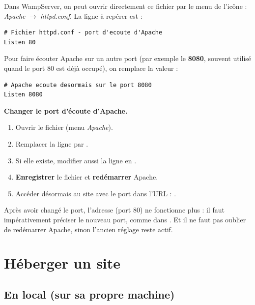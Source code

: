 Dans WampServer, on peut ouvrir directement ce fichier par le menu de l'icône :
\emph{Apache} $\rightarrow$ \emph{httpd.conf}. La ligne à repérer est :

\begin{verbatim}
# Fichier httpd.conf - port d'ecoute d'Apache
Listen 80
\end{verbatim}


Pour faire écouter Apache sur un autre port (par exemple le \textbf{8080}, souvent
utilisé quand le port 80 est déjà occupé), on remplace la valeur :

\begin{verbatim}
# Apache ecoute desormais sur le port 8080
Listen 8080
\end{verbatim}

\begin{methode}
\textbf{Changer le port d'écoute d'Apache.}
\begin{enumerate}[label=\arabic*)]
  \item Ouvrir le fichier  (menu \emph{Apache}).
  \item Remplacer la ligne  par .
  \item Si elle existe, modifier aussi la ligne  en
        .
  \item \textbf{Enregistrer} le fichier et \textbf{redémarrer} Apache.
  \item Accéder désormais au site avec le port dans l'URL :
        .
\end{enumerate}
\end{methode}

\begin{attention}
Après avoir changé le port, l'adresse  (port 80) ne fonctionne
plus : il faut impérativement préciser le nouveau port, comme dans
. Et il ne faut pas oublier de redémarrer Apache, sinon
l'ancien réglage reste actif.
\end{attention}

\section{Héberger un site}

\subsection{En local (sur sa propre machine)}

